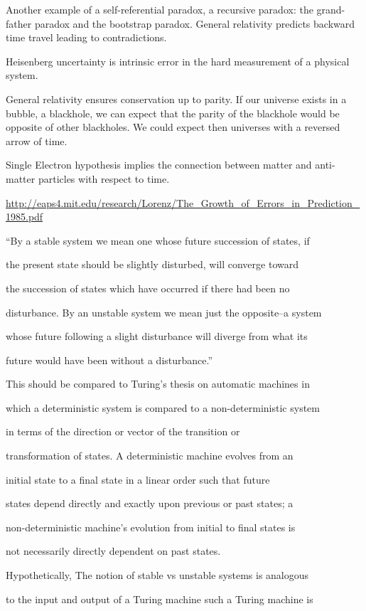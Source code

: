 Another example of a self-referential paradox, a recursive paradox: the
grand-father paradox and the bootstrap paradox. General relativity
predicts backward time travel leading to contradictions.

Heisenberg uncertainty is intrinsic error in the hard measurement of a
physical system.

General relativity ensures conservation up to parity. If our universe
exists in a bubble, a blackhole, we can expect that the parity of the
blackhole would be opposite of other blackholes. We could expect then
universes with a reversed arrow of time.

Single Electron hypothesis implies the connection between matter and
anti-matter particles with respect to time.

\url{http://eaps4.mit.edu/research/Lorenz/The_Growth_of_Errors_in_Prediction_1985.pdf}

``By a stable system we mean one whose future succession of states, if

the present state should be slightly disturbed, will converge toward

the succession of states which have occurred if there had been no

disturbance. By an unstable system we mean just the opposite--a system

whose future following a slight disturbance will diverge from what its

future would have been without a disturbance.''

This should be compared to Turing's thesis on automatic machines in

which a deterministic system is compared to a non-deterministic system

in terms of the direction or vector of the transition or

transformation of states. A deterministic machine evolves from an

initial state to a final state in a linear order such that future

states depend directly and exactly upon previous or past states; a

non-deterministic machine's evolution from initial to final states is

not necessarily directly dependent on past states.

Hypothetically, The notion of stable vs unstable systems is analogous

to the input and output of a Turing machine such a Turing machine is

